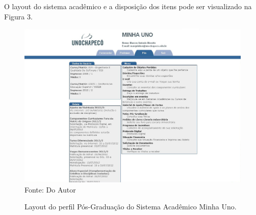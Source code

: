 O layout do sistema acadêmico e a disposição dos itens pode ser visualizado na Figura 3.

\begin{figure}[!htb]
     \centering
     \caption[Layout do Sistema - Perfil Pós-Graduação]{Layout do perfil Pós-Graduação do Sistema Acadêmico Minha Uno.}
     \includegraphics[scale=0.3]{imagens/pos.jpg}
     \\ Fonte: Do Autor
\end{figure}

